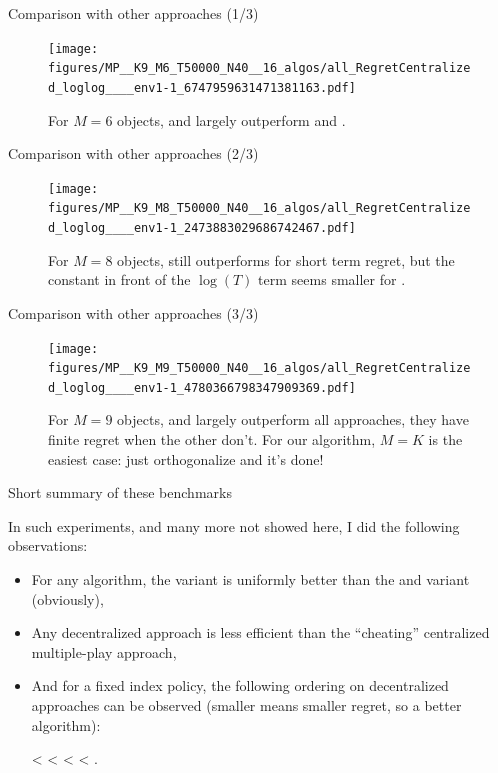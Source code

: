 \documentclass[12pt,english,ignorenonframetext,]{beamer}
\providecommand{\tightlist}{%
  \setlength{\itemsep}{0pt}\setlength{\parskip}{0pt}}
\begin{document}
\begin{frame}[plain]{Comparison with other approaches (1/3)}

\begin{figure}[h!]
\centering
\texttt{[image: figures/MP\_\_K9\_M6\_T50000\_N40\_\_16\_algos/all\_RegretCentralized\_loglog\_\_\_\_env1-1\_6747959631471381163.pdf]}
\caption{\footnotesize{For $M=6$ objects, \MCTopM{} and \RandTopM{} largely outperform \SICMMAB{} and \rhoRand.}}
\end{figure}

\end{frame}


\begin{frame}[plain]{Comparison with other approaches (2/3)}

\begin{figure}[h!]
\centering
\texttt{[image: figures/MP\_\_K9\_M8\_T50000\_N40\_\_16\_algos/all\_RegretCentralized\_loglog\_\_\_\_env1-1\_2473883029686742467.pdf]}
\caption{\footnotesize{For $M=8$ objects, \MCTopM{} still outperforms \SICMMAB{} for short term regret, but the constant in front of the $\log(T)$ term seems smaller for \SICMMAB.}}
\end{figure}

\end{frame}


\begin{frame}[plain]{Comparison with other approaches (3/3)}

\begin{figure}[h!]
\centering
\texttt{[image: figures/MP\_\_K9\_M9\_T50000\_N40\_\_16\_algos/all\_RegretCentralized\_loglog\_\_\_\_env1-1\_4780366798347909369.pdf]}
\caption{\footnotesize{For $M=9$ objects, \MCTopM{} and \RandTopM{} largely outperform all approaches, they have finite regret when the other don't. For our algorithm, $M=K$ is the easiest case: just orthogonalize and it's done!}}
\end{figure}

\end{frame}


\begin{frame}{Short summary of these benchmarks}

In such experiments, and many more not showed here, I did the following observations:

\begin{itemize}\tightlist
  \item For any algorithm, the \klUCB{} variant is uniformly better than the \UCB{} and \UCBH variant (obviously),
  \item Any decentralized approach is less efficient than the ``cheating'' centralized multiple-play approach,
  \item And for a fixed index policy, the following ordering on decentralized approaches can be observed (smaller means smaller regret, so a better algorithm):
  \begin{center}
    \MCTopM{} < \RandTopM{} < \SICMMAB{} < \Selfish{} < \rhoRand.
  \end{center}
\end{itemize}

\end{frame}
\end{document}

